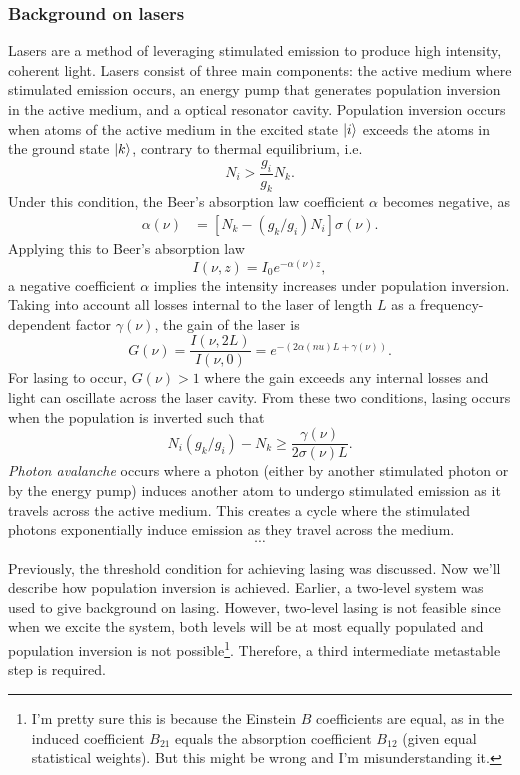 \documentclass{homework}
\begin{document}
	\subsubsection*{Background on lasers}
	Lasers are a method of leveraging stimulated emission to produce high intensity, coherent light. Lasers consist of three main components: the active medium where stimulated emission occurs, an energy pump that generates population inversion in the active medium, and a optical resonator cavity. Population inversion occurs when atoms of the active medium in the excited state $\ket{i}$ exceeds the atoms in the ground state $\ket{k}$, contrary to thermal equilibrium, i.e. $$N_i > \frac{g_i}{g_k} N_k.$$
	Under this condition, the Beer's absorption law coefficient $\alpha$ becomes negative, as
	\begin{align*}
		\alpha(\nu) & = \left[ N_k - (g_k / g_i) N_i\right] \sigma(\nu).
	\end{align*}
	Applying this to Beer's absorption law $$I(\nu, z)  = I_0 e^{-\alpha(\nu) z},$$
	a negative coefficient $\alpha$ implies the intensity increases under population inversion. Taking into account all losses internal to the laser of length $L$ as a frequency-dependent factor $\gamma(\nu)$, the gain of the laser is $$G(\nu) = \frac{I(\nu, 2L)}{I(\nu, 0)} = e^{-(2 \alpha(nu) L + \gamma(\nu))}.$$
	For lasing to occur, $G(\nu)>1$ where the gain exceeds any internal losses and light can oscillate across the laser cavity. From these two conditions, lasing occurs when the population is inverted such that $$\boxed{N_i(g_k / g_i) - N_k \ge \frac{\gamma(\nu)}{2 \sigma(\nu) L}.}$$
	\textit{Photon avalanche} occurs where a photon (either by another stimulated photon or by the energy pump) induces another atom to undergo stimulated emission as it travels across the active medium. This creates a cycle where the stimulated photons exponentially induce emission as they travel across the medium.
	$$\cdots$$
	
	Previously, the threshold condition for achieving lasing was discussed. Now we'll describe how population inversion is achieved. Earlier, a two-level system was used to give background on lasing. However, two-level lasing is not feasible since when we excite the system, both levels will be at most equally populated and population inversion is not possible\footnote{I'm pretty sure this is because the Einstein $B$ coefficients are equal, as in the induced coefficient $B_{21}$ equals the absorption coefficient $B_{12}$ (given equal statistical weights). But this might be wrong and I'm misunderstanding it.}. Therefore, a third intermediate metastable step is required.
\end{document}
